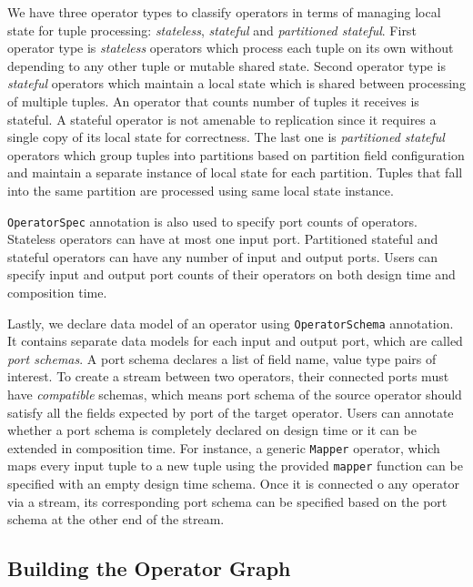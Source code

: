 We have three operator types to classify operators in terms of managing local state for tuple processing: \textit{stateless}, \textit{stateful} and \textit{partitioned stateful}. First operator type is \textit{stateless} operators which process each tuple on its own without depending to any other tuple or mutable shared state. Second operator type is \textit{stateful} operators which maintain a local state which is shared between processing of multiple tuples. An operator that counts number of tuples it receives is stateful. A stateful operator is not amenable to replication since it requires a single copy of its local state for correctness. The last one is \textit{partitioned stateful} operators which group tuples into partitions based on partition field configuration and maintain a separate instance of local state for each partition. Tuples that fall into the same partition are processed using same local state instance. 

\texttt{OperatorSpec} annotation is also used to specify port counts of operators. Stateless operators can have at most one input port. Partitioned stateful and stateful operators can have any number of input and output ports. Users can specify input and output port counts of their operators on both design time and composition time. 

Lastly, we declare data model of an operator using \texttt{OperatorSchema} annotation. It contains separate data models for each input and output port, which are called \textit{port schemas}. A port schema declares a list of field name, value type pairs of interest. To create a stream between two operators, their connected ports must have \textit{compatible} schemas, which means port schema of the source operator should satisfy all the fields expected by port of the target operator. Users can annotate whether a port schema is completely declared on design time or it can be extended in composition time. For instance, a generic \texttt{Mapper} operator, which maps every input tuple to a new tuple using the provided \texttt{mapper} function can be specified with an empty design time schema. Once it is connected o any operator via a stream, its corresponding port schema can be specified based on the port schema at the other end of the stream.




\subsection{Building the Operator Graph}\label{sec:operator-graph}